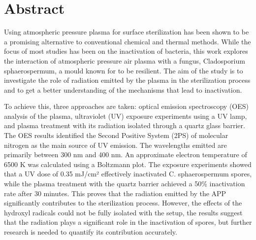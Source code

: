 \chapter*{Abstract}
Using atmospheric pressure plasma for surface sterilization has been shown to be a promising alternative to conventional chemical and thermal methods. While the focus of most studies has been on the inactivation of bacteria, this work explores the interaction of atmospheric pressure air plasma with a fungus, Cladosporium sphaerospermum, a mould known for to be resilient. The aim of the study is to investigate the role of radiation emitted by the plasma in the sterilization process and to get a better understanding of the mechanisms that lead to inactivation.

To achieve this, three approaches are taken: optical emission spectroscopy (OES) analysis of the plasma, ultraviolet (UV) exposure experiments using a UV lamp, and plasma treatment with its radiation isolated through a quartz glass barrier. The OES results identified the Second Positive System (2PS) of molecular nitrogen as the main source of UV emission. The wavelengths emitted are primarily between 300 nm and 400 nm. An approximate electron temperature of 6500 K was calculated using a Boltzmann plot. The exposure experiments showed that a UV dose of 0.35 mJ/cm² effectively inactivated C. sphaerospermum spores, while the plasma treatment with the quartz barrier achieved a 50\% inactivation rate after 30 minutes. This proves that the radiation emitted by the APP significantly contributes to the sterilization process. However, the effects of the hydroxyl radicals could not be fully isolated with the setup, the results suggest that the radiation plays a significant role in the inactivation of spores, but further research is needed to quantify its contribution accurately.